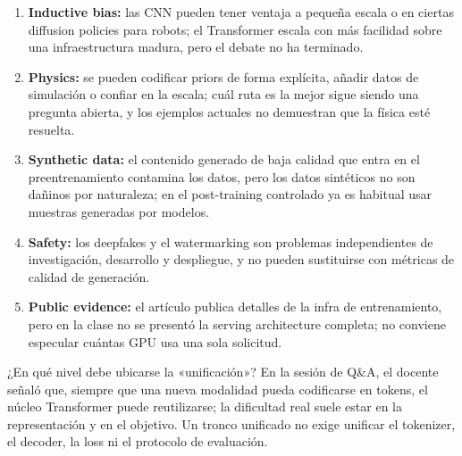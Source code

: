 \begin{enumerate}
  \item \textbf{Inductive bias:} las CNN pueden tener ventaja a pequeña escala o en ciertas diffusion policies para robots; el Transformer escala con más facilidad sobre una infraestructura madura, pero el debate no ha terminado.
  \item \textbf{Physics:} se pueden codificar priors de forma explícita, añadir datos de simulación o confiar en la escala; cuál ruta es la mejor sigue siendo una pregunta abierta, y los ejemplos actuales no demuestran que la física esté resuelta.
  \item \textbf{Synthetic data:} el contenido generado de baja calidad que entra en el preentrenamiento contamina los datos, pero los datos sintéticos no son dañinos por naturaleza; en el post-training controlado ya es habitual usar muestras generadas por modelos.
  \item \textbf{Safety:} los deepfakes y el watermarking son problemas independientes de investigación, desarrollo y despliegue, y no pueden sustituirse con métricas de calidad de generación.
  \item \textbf{Public evidence:} el artículo publica detalles de la infra de entrenamiento, pero en la clase no se presentó la serving architecture completa; no conviene especular cuántas GPU usa una sola solicitud.
\end{enumerate}

\begin{knowledgebox}{¿En qué nivel debe ubicarse la «unificación»?}
En la sesión de Q\&A, el docente señaló que, siempre que una nueva modalidad pueda codificarse en tokens, el núcleo Transformer puede reutilizarse; la dificultad real suele estar en la representación y en el objetivo. Un tronco unificado no exige unificar el tokenizer, el decoder, la loss ni el protocolo de evaluación.
\end{knowledgebox}




